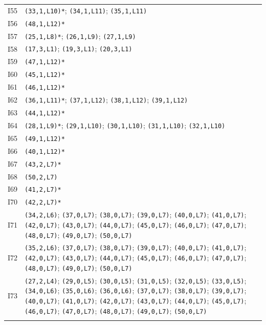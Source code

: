 {\begin{longtable}{@{}r p{14.7cm}@{}}
I55 & \texttt{(33,1,L10)*}; \texttt{(34,1,L11)}; \texttt{(35,1,L11)}\\\addlinespace[3pt]
I56 & \texttt{(48,1,L12)*}\\\addlinespace[3pt]
I57 & \texttt{(25,1,L8)*}; \texttt{(26,1,L9)}; \texttt{(27,1,L9)}\\\addlinespace[3pt]
I58 & \texttt{(17,3,L1)}; \texttt{(19,3,L1)}; \texttt{(20,3,L1)}\\\addlinespace[3pt]
I59 & \texttt{(47,1,L12)*}\\\addlinespace[3pt]
I60 & \texttt{(45,1,L12)*}\\\addlinespace[3pt]
I61 & \texttt{(46,1,L12)*}\\\addlinespace[3pt]
I62 & \texttt{(36,1,L11)*}; \texttt{(37,1,L12)}; \texttt{(38,1,L12)}; \texttt{(39,1,L12)}\\\addlinespace[3pt]
I63 & \texttt{(44,1,L12)*}\\\addlinespace[3pt]
I64 & \texttt{(28,1,L9)*}; \texttt{(29,1,L10)}; \texttt{(30,1,L10)}; \texttt{(31,1,L10)}; \texttt{(32,1,L10)}\\\addlinespace[3pt]
I65 & \texttt{(49,1,L12)*}\\\addlinespace[3pt]
I66 & \texttt{(40,1,L12)*}\\\addlinespace[3pt]
I67 & \texttt{(43,2,L7)*}\\\addlinespace[3pt]
I68 & \texttt{(50,2,L7)}\\\addlinespace[3pt]
I69 & \texttt{(41,2,L7)*}\\\addlinespace[3pt]
I70 & \texttt{(42,2,L7)*}\\\addlinespace[3pt]
I71 & \texttt{(34,2,L6)}; \texttt{(37,0,L7)}; \texttt{(38,0,L7)}; \texttt{(39,0,L7)}; \texttt{(40,0,L7)}; \texttt{(41,0,L7)}; \texttt{(42,0,L7)}; \texttt{(43,0,L7)}; \texttt{(44,0,L7)}; \texttt{(45,0,L7)}; \texttt{(46,0,L7)}; \texttt{(47,0,L7)}; \texttt{(48,0,L7)}; \texttt{(49,0,L7)}; \texttt{(50,0,L7)}\\\addlinespace[3pt]
I72 & \texttt{(35,2,L6)}; \texttt{(37,0,L7)}; \texttt{(38,0,L7)}; \texttt{(39,0,L7)}; \texttt{(40,0,L7)}; \texttt{(41,0,L7)}; \texttt{(42,0,L7)}; \texttt{(43,0,L7)}; \texttt{(44,0,L7)}; \texttt{(45,0,L7)}; \texttt{(46,0,L7)}; \texttt{(47,0,L7)}; \texttt{(48,0,L7)}; \texttt{(49,0,L7)}; \texttt{(50,0,L7)}\\\addlinespace[3pt]
I73 & \texttt{(27,2,L4)}; \texttt{(29,0,L5)}; \texttt{(30,0,L5)}; \texttt{(31,0,L5)}; \texttt{(32,0,L5)}; \texttt{(33,0,L5)}; \texttt{(34,0,L6)}; \texttt{(35,0,L6)}; \texttt{(36,0,L6)}; \texttt{(37,0,L7)}; \texttt{(38,0,L7)}; \texttt{(39,0,L7)}; \texttt{(40,0,L7)}; \texttt{(41,0,L7)}; \texttt{(42,0,L7)}; \texttt{(43,0,L7)}; \texttt{(44,0,L7)}; \texttt{(45,0,L7)}; \texttt{(46,0,L7)}; \texttt{(47,0,L7)}; \texttt{(48,0,L7)}; \texttt{(49,0,L7)}; \texttt{(50,0,L7)}\\\addlinespace[3pt]

\end{longtable}}

